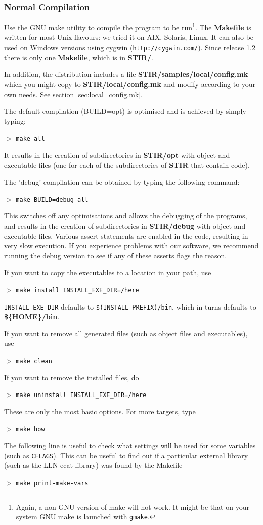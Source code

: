 \documentclass{article}
\def\R2Lurl#1#2{\mbox{\href{#1}{\tt #2}}}
\newcommand{\cmdline}[1]{\par \noindent $>$ \texttt{#1}\par}
\begin{document}
\subsubsection{
Normal Compilation}
\label{sec:normalcompilation}
Use the GNU make utility to compile the program to be run\footnote{{\small Again, 
a non-GNU version of make will not work. It might be that on 
your system GNU make is launched with \texttt{gmake}.}}. The \textbf{Makefile} 
is written for most Unix flavours: we tried it on AIX, Solaris, 
Linux. It can also be used on Windows versions using cygwin (\R2Lurl{http://cygwin.com/}{http://cygwin.com/}). 
Since release 1.2 there is only one \textbf{Makefile}, which is in \textbf{STIR/}.


In addition, the distribution includes a file \textbf{STIR/samples/local/config.mk} 
which you might copy to \textbf{STIR/local/config.mk} and modify according 
to your own needs. See section \ref{sec:local_config.mk}.


The default compilation (BUILD=opt) is optimised and is achieved 
by simply typing:
\cmdline{make all}


It results in the creation of subdirectories in \textbf{STIR/opt} 
with object and executable files (one for each of the subdirectories 
of \textbf{STIR} that contain code).


The 'debug' compilation can be obtained by typing the following 
command:
\cmdline{make BUILD=debug all}
\noindent
This switches off any optimisations and allows the debugging 
of the programs, and results in the creation of subdirectories 
in \textbf{STIR/debug} with object and executable files. Various assert 
statements are enabled in the code, resulting in very slow execution. 
If you experience problems with our software, we recommend running 
the debug version to see if any of these asserts flags the reason.


If you want to copy the executables to a location in your path, 
use
\cmdline{make install INSTALL\_EXE\_DIR=/here}

\noindent
\texttt{INSTALL\_EXE\_DIR} defaults to \texttt{\$(INSTALL\_PREFIX)/bin}, which 
in turns defaults to \textbf{\$\{HOME\}/bin}.


If you want to remove all generated files (such as object files 
and executables), use
\cmdline{make clean}


If you want to remove the installed files, do
\cmdline{make uninstall INSTALL\_EXE\_DIR=/here}

These are only the most basic options. For more targets, 
type
\cmdline{make how}
The following line is useful to check what settings will be used for some
variables (such as \texttt{CFLAGS}). This can be useful to find out
if a particular external library (such as the LLN ecat library) was 
found by the Makefile
\cmdline{make print-make-vars}
\end{document}
